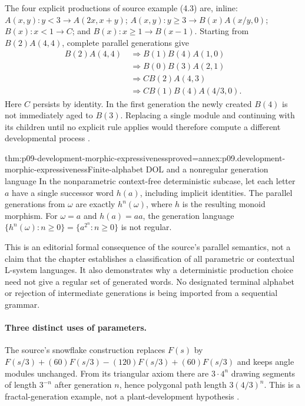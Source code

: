 The four explicit productions of source example (4.3) are, inline:
\(A(x,y):y<3\to A(2x,x+y)\);
\(A(x,y):y\geq3\to B(x)A(x/y,0)\);
\(B(x):x<1\to C\);
and \(B(x):x\geq1\to B(x-1)\).
Starting from \(B(2)A(4,4)\), complete parallel generations give
\[
\begin{aligned}
 B(2)A(4,4)&\ \Longrightarrow B(1)B(4)A(1,0)\\
 &\ \Longrightarrow B(0)B(3)A(2,1)\\
 &\ \Longrightarrow CB(2)A(4,3)\\
 &\ \Longrightarrow CB(1)B(4)A(4/3,0).
\end{aligned}
\]
Here \(C\) persists by identity. In the first generation the newly created
\(B(4)\) is not immediately aged to \(B(3)\). Replacing a single module and
continuing with its children until no explicit rule applies would therefore
compute a different developmental process
\cite[p.~548]{PrusinkiewiczEtAl1997DevelopmentIntake}.

\begin{hbtheorem}{thm:p09-development-morphic-expressiveness}{proved=annex:p09.development-morphic-expressiveness}{Finite-alphabet DOL and a nonregular generation language}
In the nonparametric context-free deterministic subcase, let each letter
\(a\) have a single successor word \(h(a)\), including implicit identities.
The parallel generations from \(\omega\) are exactly
\(h^n(\omega)\), where \(h\) is the resulting monoid morphism.
For \(\omega=a\) and \(h(a)=aa\), the generation language
\(\{h^n(\omega):n\geq0\}=\{a^{2^n}:n\geq0\}\) is not regular.
\end{hbtheorem}

This is an editorial formal consequence of the source's parallel semantics,
not a claim that the chapter establishes a classification of all parametric
or contextual L-system languages. It also demonstrates why a deterministic
production choice need not give a regular set of generated words.
No designated terminal alphabet or rejection of intermediate generations is
being imported from a sequential grammar.

\paragraph{Three distinct uses of parameters.}
The source's snowflake construction replaces \(F(s)\) by
\(F(s/3)+(60)F(s/3)-(120)F(s/3)+(60)F(s/3)\) and keeps angle modules
unchanged. From its triangular axiom there are \(3\cdot4^n\) drawing
segments of length \(3^{-n}\) after generation \(n\), hence polygonal
path length \(3(4/3)^n\). This is a fractal-generation example, not a
plant-development hypothesis \cite[p.~549]{PrusinkiewiczEtAl1997DevelopmentIntake}.

